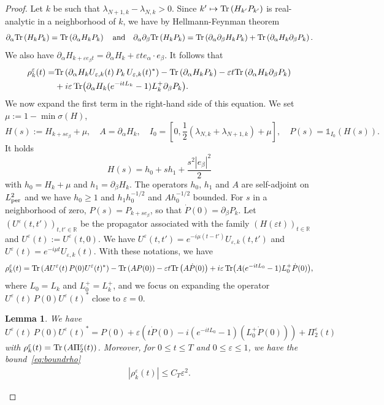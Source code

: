 \documentclass[a4paper,11pt]{article}
\theoremstyle{plain}
\newtheorem{lemma}[theorem]{Lemma}
\theoremstyle{remark}
\def\R{{\mathbb R}}
\def\eps{{\varepsilon}}
\def\1{{\mathds 1}}
\begin{document}
\begin{proof}[Proof]  Let $k$ be such that $\lambda_{N+1,k}-\lambda_{N,k} > 0$. Since $k' \mapsto {\rm Tr} \left(H_{k'} P_{k'}\right)$ is real-analytic in a neighborhood of $k$, we have by Hellmann-Feynman theorem
\begin{align*}
 \partial_\alpha {\rm Tr} \left(H_k P_k\right) =  {\rm Tr} \left(\partial_\alpha H_k P_k\right) \quad \mbox{and} \quad
  {\partial_\alpha\partial_\beta} {\rm Tr} \left(H_k P_k\right) =  {\rm Tr}
\left(  {\partial_\alpha\partial_\beta}
 H_k P_k\right) +  {\rm Tr} \left(\partial_\alpha H_k \partial_\beta P_k\right).
\end{align*}
We also have $\partial_\alpha H_{k+\eps e_\beta t} =
\partial_\alpha H_k + \eps t e_\alpha \cdot e_\beta$. It follows that
\begin{align*}
\rho^\eps_k(t)=&{\rm Tr} \left(\partial_\alpha H_kU_{\eps,k}(t)\, P_k\, U_{\eps,k}(t)^*\right) - {\rm Tr} \left(\partial_\alpha H_k P_k\right) - \eps t  {\rm Tr} \left(\partial_\alpha H_k \partial_\beta P_k\right) \\ & + i \eps \Tr(\partial_\alpha H_k (e^{-i t L_k} - 1) L_{k}^{+}  \partial_\beta P_k).
\end{align*}
We now expand the first term in the right-hand side of this equation. We set $\mu := 1 - \min \sigma(H)$,
$$H(s):=H_{k+se_\beta}+\mu,\quad A=\partial_\alpha H_k, \quad
I_{0}=[0,\frac 12(\lambda_{N,k}+\lambda_{N+1,k})+\mu],\quad P(s)=\1_{I_{0}}(H(s)).$$
It holds
$$H(s)=h_0+sh_1+\frac{s^2 |e_\beta|^{2}}2$$
 with $h_0=H_k+\mu$ and $h_1=\partial_\beta H_k$. The operators $h_0$, $h_1$ and $A$ are self-adjoint on $L^2_{\rm per}$ and we have $h_0 \ge 1$ and $h_1h_0^{-1/2}$ and $Ah_0^{-1/2}$ bounded.
  For $s$ in a neighborhood of zero, $P(s)= P_{k+se_\beta}$, so that $\dot{P}(0)=\partial_\beta P_k$.  Let $(U^\eps(t,t'))_{t,t' \in \R}$ be the propagator associated with the family $(H(\eps t))_{t \in \R}$ and $U^\eps(t):=U^\eps(t,0)$.
We have $U^\eps(t,t')=e^{-i\mu(t-t')} U_{\eps,k}(t,t')$ and $U^\eps(t)=e^{-i\mu t} U_{\eps,k}(t)$.
With these notations, we have
$$
\rho^\eps_k(t)={\rm Tr} \left(A U^\eps(t)\, P(0) U^\eps(t)^*\right) - {\rm Tr} \left(AP(0) \right) - \eps t  {\rm Tr} \left(A  \dot{P}(0) \right) + i \eps \Tr(A (e^{-i t L_0} - 1) L_0^{+}  \dot{P}(0)),
$$
where $L_0=L_k$ and $L_0^+=L_k^+$, and we focus on expanding the operator $U^\eps(t)\, P(0) U^\eps(t)^*$ close to $\eps=0$.

\begin{lemma}\label{lem:Dyson+}
We have
\begin{equation}\label{eq:Dyson+}
U^\eps(t)\, P(0) U^\eps(t)^* = P(0) +  \eps \left(t \dot{P}(0) - i \left( e^{-itL_0}-1 \right) (L_0^+\dot{P}(0))\right) + \Pi^\eps_2(t)
\end{equation}
with $\rho^\eps_k(t) = {\rm Tr} \left(A \Pi_2^\eps(t) \right)$.
Moreover, for $0\le t\le T$ and $0\le\eps\le1$, we have the bound~\eqref{eq:boundrho}
\begin{align*}
  |\rho^\eps_k(t)| \le C_T \eps^2.
\end{align*}


\end{lemma}
\end{proof}
\end{document}
